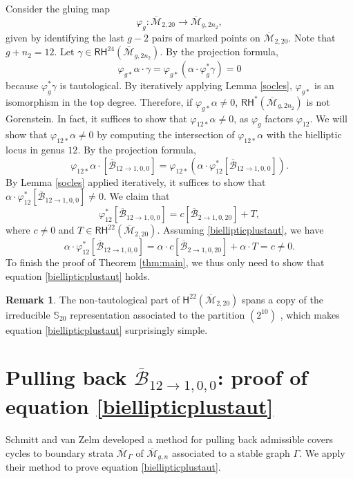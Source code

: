 \documentclass[12pt]{amsart}
\theoremstyle{definition}
\newtheorem{rem}[thm]{Remark}
\renewcommand{\H}{\mathsf{H}}
\newcommand{\RH}{\mathsf{RH}}
\newcommand{\Bb}{\overline{\mathcal{B}}}
\newcommand{\M}{\mathcal{M}}
\newcommand{\Mb}{\overline{\M}}
\begin{document}
Consider the gluing map
\[
\varphi_g: \Mb_{2,20}\rightarrow \Mb_{g,2n_2},
\]
given by identifying the last $g-2$ pairs of marked points on $\Mb_{2,20}$. Note that $g+n_2=12$.  Let $\gamma\in \RH^{24}(\Mb_{g,2n_2})$. By the projection formula,
\[
\varphi_{g*}\alpha\cdot \gamma = \varphi_{g*}(\alpha\cdot \varphi_{g}^*\gamma)=0 
\]
because $\varphi_g^*\gamma$ is tautological. By iteratively applying Lemma \ref{socles}, $\varphi_{g*}$ is an isomorphism in the top degree. Therefore, if $\varphi_{g*}\alpha\neq 0$, $\RH^*(\Mb_{g,2n_2})$ is not Gorenstein. In fact, it suffices to show that $\varphi_{12*}\alpha\neq 0$, as $\varphi_{g}$ factors $\varphi_{12}$. We will show that $\varphi_{12*}\alpha\neq 0$ by computing the intersection of $\varphi_{12*}\alpha$ with the bielliptic locus in genus $12$. By the projection formula,
\[
\varphi_{12*}\alpha\cdot[\Bb_{12\rightarrow 1,0,0}]=\varphi_{12*}(\alpha\cdot\varphi_{12}^*[\Bb_{12\rightarrow 1,0,0}]).
\]
By Lemma \ref{socles} applied iteratively, it suffices to show that $\alpha\cdot\varphi_{12}^*[\Bb_{12\rightarrow 1,0,0}]\neq 0$. We claim that
\begin{equation}\label{biellipticplustaut}
    \varphi_{12}^*[\Bb_{12\rightarrow 1,0,0}]=c[\Bb_{2\rightarrow 1,0,20}]+T,
\end{equation}
where $c\neq 0$ and $T\in \RH^{22}(\Mb_{2,20})$. Assuming \eqref{biellipticplustaut}, we have
\[
\alpha\cdot\varphi_{12}^*[\Bb_{12\rightarrow 1,0,0}]=\alpha\cdot c[\Bb_{2\rightarrow 1,0,20}] + \alpha\cdot T = c \neq 0.
\]
To finish the proof of Theorem \ref{thm:main}, we thus only need to show that equation \eqref{biellipticplustaut} holds.

\begin{rem}
    The non-tautological part of $\H^{22}(\Mb_{2,20})$ spans a copy of the irreducible $\mathbb{S}_{20}$ representation associated to the partition $(2^{10})$ \cite[Remark 3.10]{Petersen}, which makes equation \eqref{biellipticplustaut} surprisingly simple.
\end{rem}


\section{Pulling back $\Bb_{12\rightarrow 1,0,0}$: proof of equation \eqref{biellipticplustaut}}\label{sec:nonzero}
Schmitt and van Zelm \cite{SvZ} developed a method for pulling back admissible covers cycles to boundary strata $\Mb_{\Gamma}$ of $\Mb_{g,n}$ associated to a stable graph $\Gamma$. We apply their method to prove equation \eqref{biellipticplustaut}. 
\end{document}
